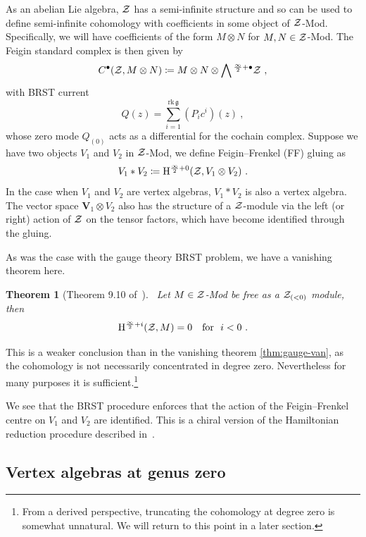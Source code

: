 \documentclass[a4paper]{article}
\newtheorem{thm}{Theorem}[section]
\def\ZZ{{\cal Z}}
\def\gf{\mathfrak{g}}
\newcommand{\Hi}[1]{\mathrm{H}^{\frac{\infty}{2}+#1}}
\newcommand{\Li}[1]{\mathrm{\bigwedge}\,^{\frac{\infty}{2}+#1}}
\def\V{\mathbf{V}}
\begin{document}
As an abelian Lie algebra, $\ZZ$ has a semi-infinite structure and so can be used to define semi-infinite cohomology with coefficients in some object of $\ZZ$-Mod. Specifically, we will have coefficients of the form $M\otimes N$ for $M,N\in\ZZ$-Mod. The Feigin standard complex is then given by
\begin{equation}
	C^\bullet(\ZZ,M\otimes N) \coloneqq  M\otimes N \otimes\Li{\bullet}\ZZ~,
\end{equation}
with BRST current
\begin{equation}
	Q(z) = \sum_{i=1}^{\mathrm{rk}\,\gf}(P_ic^i)(z)~,
\end{equation}
whose zero mode $Q_{(0)}$ acts as a differential for the cochain complex. Suppose we have two objects $V_1$ and $V_2$ in $\ZZ$-Mod, we define Feigin--Frenkel (FF) gluing as
\begin{equation}
	V_1\ast V_2\coloneqq \Hi{0}(\ZZ,V_1\otimes V_2)~.
\end{equation}
In the case when $V_1$ and $V_2$ are vertex algebras, $V_1\ast V_2$ is also a vertex algebra. The vector space $\V_1\otimes V_2$ also has the structure of a $\ZZ$-module via the left (or right) action of $\ZZ$ on the tensor factors, which have become identified through the gluing.

As was the case with the gauge theory BRST problem, we have a vanishing theorem here.
\begin{thm}[Theorem 9.10 of~\cite{Arakawa:2018egx}]~\label{thm:van-ff}
    Let $M\in\ZZ$-Mod be free as a $\ZZ_{(<0)}$ module, then
    \begin{equation*}
        \Hi{i}(\ZZ,M) = 0 \quad \textrm{for}~~i<0~.
    \end{equation*}
\end{thm}
This is a weaker conclusion than in the vanishing theorem \ref{thm:gauge-van}, as the cohomology is not necessarily concentrated in degree zero. Nevertheless for many purposes it is sufficient.\footnote{From a derived perspective, truncating the cohomology at degree zero is somewhat unnatural. We will return to this point in a later section.}

We see that the BRST procedure enforces that the action of the Feigin--Frenkel centre on $V_1$ and $V_2$ are identified. This is a chiral version of the Hamiltonian reduction procedure described in~\cite{Ginzburg:2018}.

\subsection{Vertex algebras at genus zero}
\label{ssec:chiral_background/genus-zero}
\end{document}
